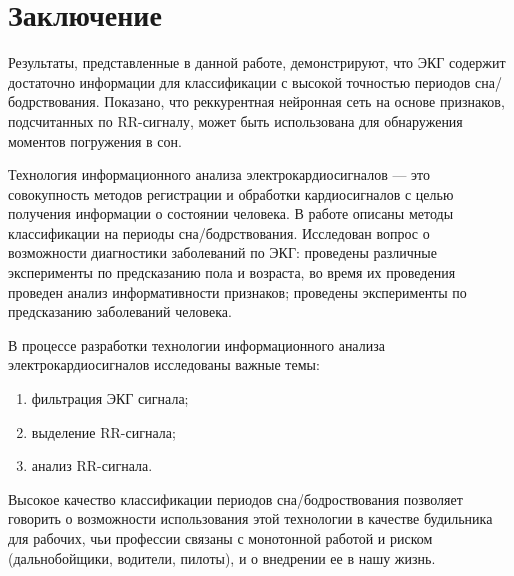\chapter{Заключение}
Результаты, представленные в данной работе, демонстрируют, что ЭКГ содержит достаточно информации для классификации с высокой точностью периодов сна/бодрствования. Показано, что реккурентная нейронная сеть на основе признаков, подсчитанных по RR-сигналу, может быть использована для обнаружения моментов погружения в сон.

Технология информационного анализа электрокардиосигналов — это совокупность методов регистрации и обработки кардиосигналов с целью получения информации о состоянии человека. В работе описаны методы классификации на периоды сна/бодрствования. Исследован вопрос о возможности диагностики заболеваний по ЭКГ:
проведены различные эксперименты по предсказанию пола и возраста, во время их проведения проведен анализ информативности признаков; проведены эксперименты по предсказанию заболеваний человека.

В процессе разработки технологии информационного анализа электрокардиосигналов исследованы важные темы:
\begin{enumerate}
	\item фильтрация ЭКГ сигнала;
	\item выделение RR-сигнала;
	\item анализ RR-сигнала.
\end{enumerate}

Высокое качество классификации периодов сна/бодроствования позволяет говорить о возможности использования этой технологии в качестве будильника для рабочих, чьи профессии связаны с монотонной работой и риском (дальнобойщики, водители, пилоты), и о внедрении ее в нашу жизнь.